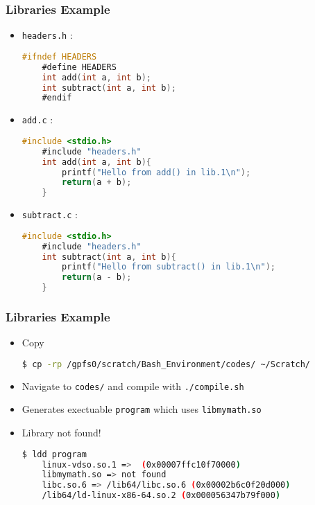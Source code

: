 \documentclass{beamer}
\newcommand{\code}[1]{\colorbox{codegray}{\texttt{#1}}}
\begin{document}
\begin{frame}[fragile]
\frametitle{Libraries Example}
\begin{itemize}
    \item \code{headers.h} : 
    \begingroup
    \scriptsize
    \begin{lstlisting}[backgroundcolor = \color{codegray}, language = C, showstringspaces=false]
    #ifndef HEADERS
    #define HEADERS
    int add(int a, int b);
    int subtract(int a, int b);
    #endif
    \end{lstlisting}
    \endgroup
    
    \item \code{add.c} : 
    \begingroup
    \scriptsize
    \begin{lstlisting}[backgroundcolor = \color{codegray}, language = C, showstringspaces=false]
    #include <stdio.h>
    #include "headers.h"
    int add(int a, int b){
        printf("Hello from add() in lib.1\n");
        return(a + b);
    }
    \end{lstlisting}
    \endgroup
    
    
    \item \code{subtract.c} : 
    \begingroup
    \scriptsize
    \begin{lstlisting}[backgroundcolor = \color{codegray}, language = C, showstringspaces=false]
    #include <stdio.h>
    #include "headers.h"
    int subtract(int a, int b){
        printf("Hello from subtract() in lib.1\n");
        return(a - b);
    }
    \end{lstlisting}
    \endgroup
\end{itemize}
\end{frame}


\begin{frame}[fragile]
\frametitle{Libraries Example}
\begin{itemize}
    \item Copy 
    \begingroup
    \scriptsize
    \begin{lstlisting}[backgroundcolor = \color{codegray}, language = Bash, showstringspaces=false]
    $ cp -rp /gpfs0/scratch/Bash_Environment/codes/ ~/Scratch/
    \end{lstlisting}
    \endgroup
    \pause

    \item Navigate to \code{codes/} and compile with \code{./compile.sh} 
    \pause

    \item Generates exectuable \code{program} which uses \code{libmymath.so}
    \pause

    \item Library not found!
    \begingroup
    \scriptsize
    \begin{lstlisting}[backgroundcolor = \color{codegray}, language = Bash, showstringspaces=false]
    $ ldd program
	linux-vdso.so.1 =>  (0x00007ffc10f70000)
	libmymath.so => not found
	libc.so.6 => /lib64/libc.so.6 (0x00002b6c0f20d000)
	/lib64/ld-linux-x86-64.so.2 (0x000056347b79f000)
    \end{lstlisting}
    \endgroup
\end{itemize}
\end{frame}
\end{document}
